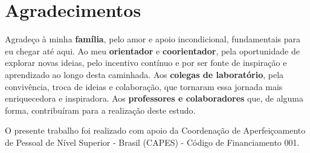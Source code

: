 \chapter*{Agradecimentos}

Agradeço à minha \textbf{família}, pelo amor e apoio incondicional, fundamentais para eu chegar até aqui.  
Ao meu \textbf{orientador} e \textbf{coorientador}, pela oportunidade de explorar novas ideias, pelo incentivo contínuo e por ser fonte de inspiração e aprendizado ao longo desta caminhada.  
Aos \textbf{colegas de laboratório}, pela convivência, troca de ideias e colaboração, que tornaram essa jornada mais enriquecedora e inspiradora.  
Aos \textbf{professores e colaboradores} que, de alguma forma, contribuíram para a realização deste estudo.

\bigskip
\noindent

O presente trabalho foi realizado com apoio da Coordenação de Aperfeiçoamento de Pessoal de Nível Superior - Brasil (CAPES) - Código de Financiamento 001.